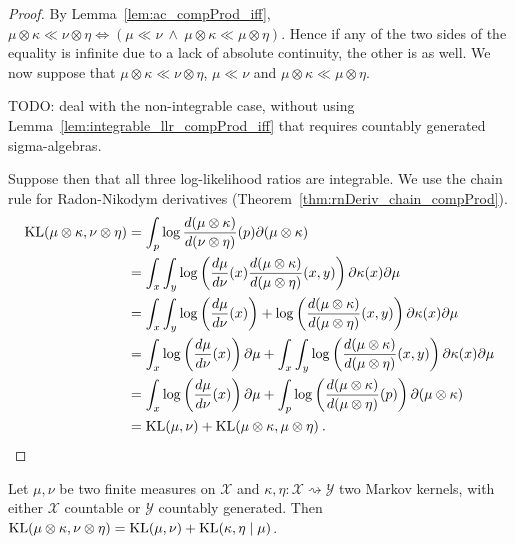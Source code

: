 \begin{proof}%
{}
By Lemma~\ref{lem:ac_compProd_iff}, $\mu \otimes \kappa \ll \nu \otimes \eta \iff \left( \mu \ll \nu \ \wedge \ \mu \otimes \kappa \ll \mu \otimes \eta \right)$.
Hence if any of the two sides of the equality is infinite due to a lack of absolute continuity, the other is as well.
We now suppose that $\mu \otimes \kappa \ll \nu \otimes \eta$, $\mu \ll \nu$ and $\mu \otimes \kappa \ll \mu \otimes \eta$.

TODO: deal with the non-integrable case, without using Lemma~\ref{lem:integrable_llr_compProd_iff} that requires countably generated sigma-algebras.

Suppose then that all three log-likelihood ratios are integrable.
We use the chain rule for Radon-Nikodym derivatives (Theorem~\ref{thm:rnDeriv_chain_compProd}).
\begin{align*}
\operatorname{KL}(\mu \otimes \kappa, \nu \otimes \eta)
&= \int_p \log \frac{d(\mu \otimes \kappa)}{d(\nu \otimes \eta)}(p) \partial (\mu \otimes \kappa)
\\
&= \int_x \int_y\log \left(\frac{d\mu}{d \nu}(x)\frac{d(\mu \otimes \kappa)}{d (\mu \otimes \eta)}(x,y)\right) \partial \kappa(x) \partial\mu
\\
&= \int_x \int_y\log \left(\frac{d\mu}{d \nu}(x)\right) + \log \left(\frac{d(\mu \otimes \kappa)}{d (\mu \otimes \eta)}(x,y)\right) \partial \kappa(x) \partial\mu
\\
&= \int_x \log \left(\frac{d\mu}{d \nu}(x)\right)\partial\mu + \int_x \int_y\log \left(\frac{d(\mu \otimes \kappa)}{d (\mu \otimes \eta)}(x,y)\right) \partial \kappa(x) \partial\mu
\\
&= \int_x \log \left(\frac{d\mu}{d \nu}(x)\right)\partial\mu + \int_p\log \left(\frac{d(\mu \otimes \kappa)}{d (\mu \otimes \eta)}(p)\right) \partial (\mu \otimes \kappa)
\\
&= \operatorname{KL}(\mu, \nu) + \operatorname{KL}(\mu \otimes \kappa, \mu \otimes \eta)
\: .
\end{align*}
\end{proof}


\begin{theorem}
  \label{thm:kl_compProd}
  \leanok
  Let $\mu, \nu$ be two finite measures on $\mathcal X$ and $\kappa, \eta : \mathcal X \rightsquigarrow \mathcal Y$ two Markov kernels, with either $\mathcal X$ countable or $\mathcal{Y}$ countably generated.
  Then $\operatorname{KL}(\mu \otimes \kappa, \nu \otimes \eta) = \operatorname{KL}(\mu, \nu) + \operatorname{KL}(\kappa, \eta \mid \mu)$.
\end{theorem}


